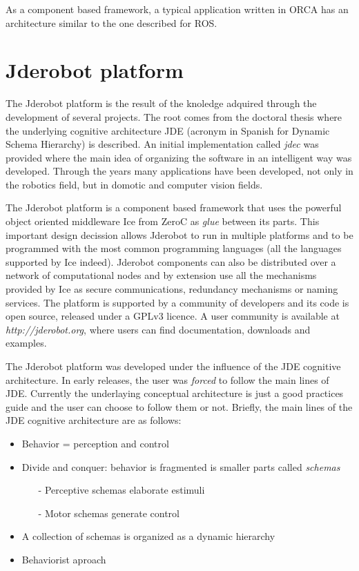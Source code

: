 \documentclass[twocolumn]{svjour3}          %
\begin{document}
As a component based framework, a typical application written in ORCA has an architecture similar to the one described for ROS.


\section{Jderobot platform}
\label{sec:jderobot}
The Jderobot platform is the result of the knoledge adquired through
the development of several projects. The root comes from the doctoral
thesis \cite{canas02} where the underlying cognitive architecture JDE (acronym in Spanish for Dynamic
Schema Hierarchy) is
described. An initial implementation called \textit{jdec} was provided
where the main idea of organizing the
software in an intelligent way was developed. Through the years many
applications have been developed, not only in 
the robotics field, but in domotic and computer vision fields.

The Jderobot platform is a component based framework that uses the powerful object oriented middleware Ice from ZeroC as \textit{glue} between its parts. This important design decission allows Jderobot to run in multiple platforms and to be programmed with the most common programming languages (all the languages supported by Ice indeed). Jderobot components can also be distributed over a network of computational nodes and by extension use all the mechanisms provided by Ice as secure communications, redundancy mechanisms or naming services. The platform is supported by a community of developers and its code is open source, released under a GPLv3 licence. A user community is available at \textit{http://jderobot.org}, where users can find documentation, downloads and examples.

The Jderobot platform was developed under the influence of the JDE cognitive architecture. In early releases, the user was \textit{forced} to follow the main lines of JDE. Currently the underlaying conceptual architecture is just a good practices guide and the user can choose to follow them or not. Briefly, the main lines of the JDE cognitive architecture are as follows:

\begin{itemize}
\item Behavior = {perception} and {control}
\item Divide and conquer: behavior is fragmented is smaller parts called \textit{schemas}
\begin{itemize}
\item[-] Perceptive schemas elaborate estimuli
\item[-] Motor schemas generate control
\end{itemize}
\item A collection of schemas is organized as a dynamic hierarchy
\item Behaviorist aproach
\end{itemize}
\end{document}
